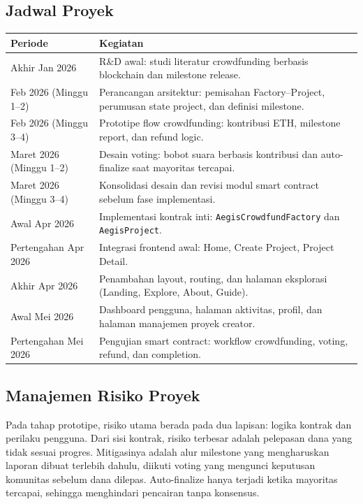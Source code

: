 \documentclass[12pt]{article}
\begin{document}
\subsection{Jadwal Proyek}
\begin{longtable}{p{} p{}}
	\toprule
	\textbf{Periode} & \textbf{Kegiatan} \\
\midrule
Akhir Jan 2026 & R\&D awal: studi literatur crowdfunding berbasis blockchain dan milestone release. \\
Feb 2026 (Minggu 1--2) & Perancangan arsitektur: pemisahan Factory--Project, perumusan state project, dan definisi milestone. \\
Feb 2026 (Minggu 3--4) & Prototipe flow crowdfunding: kontribusi ETH, milestone report, dan refund logic. \\
Maret 2026 (Minggu 1--2) & Desain voting: bobot suara berbasis kontribusi dan auto-finalize saat mayoritas tercapai. \\
Maret 2026 (Minggu 3--4) & Konsolidasi desain dan revisi modul smart contract sebelum fase implementasi. \\
Awal Apr 2026 & Implementasi kontrak inti: \texttt{AegisCrowdfundFactory} dan \texttt{AegisProject}. \\
Pertengahan Apr 2026 & Integrasi frontend awal: Home, Create Project, Project Detail. \\
Akhir Apr 2026 & Penambahan layout, routing, dan halaman eksplorasi (Landing, Explore, About, Guide). \\
Awal Mei 2026 & Dashboard pengguna, halaman aktivitas, profil, dan halaman manajemen proyek creator. \\
Pertengahan Mei 2026 & Pengujian smart contract: workflow crowdfunding, voting, refund, dan completion. \\
\bottomrule
\end{longtable}

\subsection{Manajemen Risiko Proyek}
Pada tahap prototipe, risiko utama berada pada dua lapisan: logika kontrak dan perilaku pengguna. Dari sisi kontrak, risiko terbesar adalah pelepasan dana yang tidak sesuai progres. Mitigasinya adalah alur milestone yang mengharuskan laporan dibuat terlebih dahulu, diikuti voting yang mengunci keputusan komunitas sebelum dana dilepas. Auto-finalize hanya terjadi ketika mayoritas tercapai, sehingga menghindari pencairan tanpa konsensus.
\end{document}
